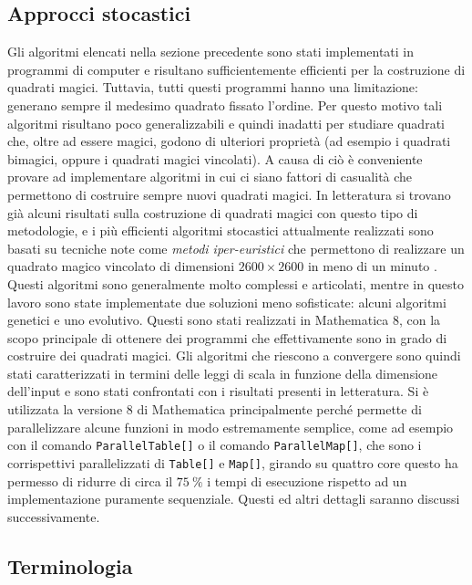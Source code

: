 \documentclass[italian,twoside,twocolumn]{article}
\begin{document}
\subsection{Approcci stocastici}
Gli algoritmi elencati nella sezione precedente sono stati implementati in programmi di computer e risultano sufficientemente efficienti per la costruzione di quadrati magici. Tuttavia, tutti questi programmi hanno una limitazione: generano sempre il medesimo quadrato fissato l'ordine. Per questo motivo tali algoritmi risultano poco generalizzabili e quindi inadatti per studiare quadrati che, oltre ad essere magici, godono di ulteriori proprietà (ad esempio i quadrati bimagici, oppure i quadrati magici vincolati). A causa di ciò è conveniente provare ad implementare algoritmi in cui ci siano fattori di casualità che permettono di costruire sempre nuovi quadrati magici. In letteratura si trovano già alcuni risultati sulla costruzione di quadrati magici con questo tipo di metodologie, e i più efficienti algoritmi stocastici attualmente realizzati sono basati su tecniche note come \emph{metodi iper-euristici} che permettono di realizzare un quadrato magico vincolato di dimensioni $ 2600\times 2600 $ in meno di un minuto \cite{AhmedEnder:2014}. Questi algoritmi sono generalmente molto complessi e articolati, mentre in questo lavoro sono state implementate due soluzioni meno sofisticate: alcuni algoritmi genetici e uno evolutivo. Questi sono stati realizzati in Mathematica 8, con la scopo principale di ottenere dei programmi che effettivamente sono in grado di costruire dei quadrati magici. Gli algoritmi che riescono a convergere sono quindi stati caratterizzati in termini delle leggi di scala in funzione della dimensione dell'input e sono stati confrontati con i risultati presenti in letteratura. Si è utilizzata la versione 8 di Mathematica principalmente perché permette di parallelizzare alcune funzioni in modo estremamente semplice, come ad esempio con il comando \texttt{ParallelTable[]} o il comando \texttt{ParallelMap[]}, che sono i corrispettivi parallelizzati di \texttt{Table[]} e \texttt{Map[]}, girando su quattro core questo ha permesso di ridurre di circa il $ \SI{75}{\percent} $ i tempi di esecuzione rispetto ad un implementazione puramente sequenziale. Questi ed altri dettagli saranno discussi successivamente.

\subsection{Terminologia}
\end{document}
